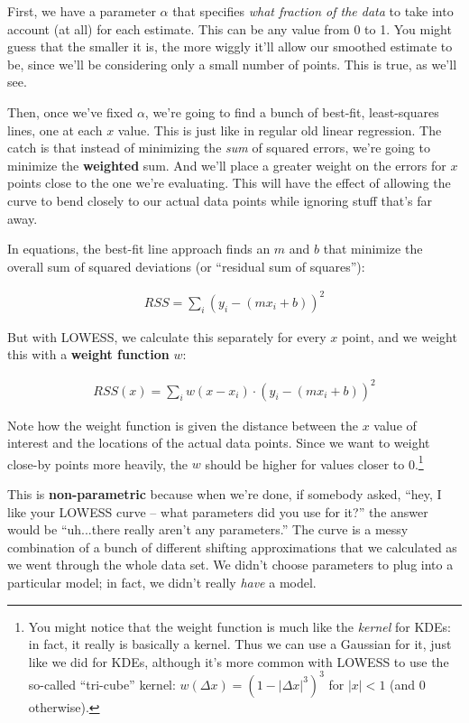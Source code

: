 First, we have a parameter $\alpha$ that specifies \textit{what fraction of
the data} to take into account (at all) for each estimate. This can be any
value from 0 to 1. You might guess that the smaller it is, the more wiggly
it'll allow our smoothed estimate to be, since we'll be considering only a
small number of points. This is true, as we'll see.

Then, once we've fixed $\alpha$, we're going to find a bunch of best-fit,
least-squares lines, one at each $x$ value. This is just like in regular old
linear regression. The catch is that instead of minimizing the \textit{sum} of
squared errors, we're going to minimize the \textbf{weighted} sum. And we'll
place a greater weight on the errors for $x$ points close to the one we're
evaluating. This will have the effect of allowing the curve to bend closely to
our actual data points while ignoring stuff that's far away.

In equations, the best-fit line approach finds an $m$ and $b$ that minimize
the overall sum of squared deviations (or ``residual sum of squares''):

\begin{align*}
RSS = \sum_i (y_i - (mx_i + b))^2
\end{align*}

But with LOWESS, we calculate this separately for every $x$ point, and we
weight this with a \textbf{weight function} $w$:

\begin{align*}
RSS(x) = \sum_i w(x-x_i) \cdot (y_i - (mx_i + b))^2
\end{align*}

Note how the weight function is given the distance between the $x$ value of
interest and the locations of the actual data points. Since we want to weight
close-by points more heavily, the $w$ should be higher for values closer to 
0.\footnote{You might notice that the weight function is much like the
\textit{kernel} for KDEs: in fact, it really is basically a kernel. Thus we
can use a Gaussian for it, just like we did for KDEs, although it's more
common with LOWESS to use the so-called ``tri-cube'' kernel: $w(\Delta x) = (1 -
|\Delta x|^3)^3$ for $|x|<1$ (and 0 otherwise).}

This is \textbf{non-parametric} because when we're done, if somebody asked,
``hey, I like your LOWESS curve -- what parameters did you use for it?'' the
answer would be ``uh...there really aren't any parameters.'' The curve is a
messy combination of a bunch of different shifting approximations that we
calculated as we went through the whole data set. We didn't choose parameters
to plug into a particular model; in fact, we didn't really \textit{have} a
model.

